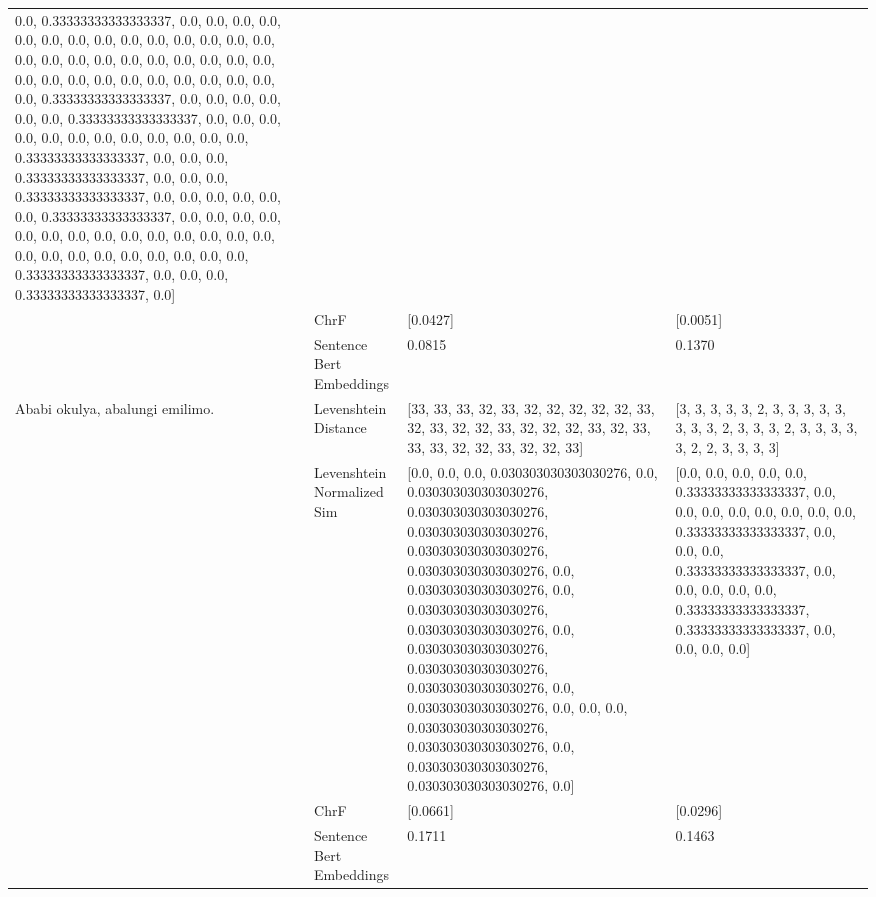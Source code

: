 \begin{tabular}{llll}
0.0, 0.33333333333333337, 0.0, 0.0, 0.0, 0.0, 0.0, 0.0, 0.0, 0.0, 0.0, 0.0, 0.0, 0.0, 0.0, 0.0, 0.0, 0.0, 0.0, 0.0, 0.0, 0.0, 0.0, 0.0, 0.0, 0.0, 0.0, 0.0, 0.0, 0.0, 0.0, 0.0, 0.0, 0.0, 0.0, 0.0, 0.0, 0.33333333333333337, 0.0, 0.0, 0.0, 0.0, 0.0, 0.0, 0.33333333333333337, 0.0, 0.0, 0.0, 0.0, 0.0, 0.0, 0.0, 0.0, 0.0, 0.0, 0.0, 0.0, 0.33333333333333337, 0.0, 0.0, 0.0, 0.33333333333333337, 0.0, 0.0, 0.0, 0.33333333333333337, 0.0, 0.0, 0.0, 0.0, 0.0, 0.0, 0.33333333333333337, 0.0, 0.0, 0.0, 0.0, 0.0, 0.0, 0.0, 0.0, 0.0, 0.0, 0.0, 0.0, 0.0, 0.0, 0.0, 0.0, 0.0, 0.0, 0.0, 0.0, 0.0, 0.0, 0.0, 0.33333333333333337, 0.0, 0.0, 0.0, 0.33333333333333337, 0.0] \\
 & ChrF & [0.0427] & [0.0051] \\
 & Sentence Bert Embeddings & 0.0815 & 0.1370 \\
\cline{1-4}
\multirow[t]{4}{*}{Ababi okulya, abalungi emilimo.} & Levenshtein Distance & [33, 33, 33, 32, 33, 32, 32, 32, 32, 32, 33, 32, 33, 32, 32, 33, 32, 32, 32, 33, 32, 33, 33, 33, 32, 32, 33, 32, 32, 33] & [3, 3, 3, 3, 3, 2, 3, 3, 3, 3, 3, 3, 3, 3, 2, 3, 3, 3, 2, 3, 3, 3, 3, 3, 2, 2, 3, 3, 3, 3] \\
 & Levenshtein Normalized Sim & [0.0, 0.0, 0.0, 0.030303030303030276, 0.0, 0.030303030303030276, 0.030303030303030276, 0.030303030303030276, 0.030303030303030276, 0.030303030303030276, 0.0, 0.030303030303030276, 0.0, 0.030303030303030276, 0.030303030303030276, 0.0, 0.030303030303030276, 0.030303030303030276, 0.030303030303030276, 0.0, 0.030303030303030276, 0.0, 0.0, 0.0, 0.030303030303030276, 0.030303030303030276, 0.0, 0.030303030303030276, 0.030303030303030276, 0.0] & [0.0, 0.0, 0.0, 0.0, 0.0, 0.33333333333333337, 0.0, 0.0, 0.0, 0.0, 0.0, 0.0, 0.0, 0.0, 0.33333333333333337, 0.0, 0.0, 0.0, 0.33333333333333337, 0.0, 0.0, 0.0, 0.0, 0.0, 0.33333333333333337, 0.33333333333333337, 0.0, 0.0, 0.0, 0.0] \\
 & ChrF & [0.0661] & [0.0296] \\
 & Sentence Bert Embeddings & 0.1711 & 0.1463 \\
\cline{1-4}

\end{tabular}
